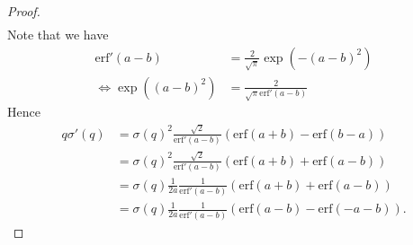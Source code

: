 \documentclass{article}
\theoremstyle{plain}
\theoremstyle{definition}
\theoremstyle{remark}
\begin{document}
\begin{proof}
\begin{align}
\end{align}
Note that we have
\begin{align}
    \text{erf}'(a-b) &= \frac{2}{\sqrt{\pi}} \exp(-(a-b)^2) \\
    \Leftrightarrow 
    \exp((a-b)^2) &= \frac{2}{\sqrt{\pi} \text{erf}'(a-b)}
\end{align}
Hence
\begin{align}
    q \sigma'(q) 
        &= \sigma(q)^2 \frac{\sqrt{2}}{\text{erf}'(a-b)} (\text{erf}(a+b) - \text{erf}(b-a)) \\
        &= \sigma(q)^2 \frac{\sqrt{2}}{\text{erf}'(a-b)} (\text{erf}(a+b) + \text{erf}(a-b)) \\
        &= \sigma(q) \frac{1}{2 a} \frac{1}{\text{erf}'(a-b)} (\text{erf}(a+b) + \text{erf}(a-b)) \\
        &= \sigma(q) \frac{1}{2 a} \frac{1}{\text{erf}'(a-b)} (\text{erf}(a-b) - \text{erf}(-a-b)).
\end{align}

\end{proof}
\end{document}
